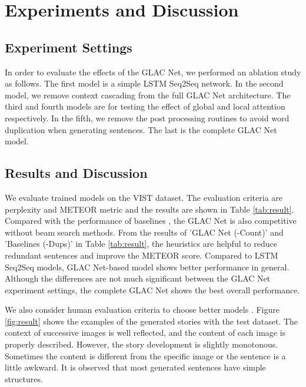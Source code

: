 \documentclass[11pt,a4paper]{article}
\begin{document}
\section{Experiments and Discussion}
\subsection{Experiment Settings}

In order to evaluate the effects of the GLAC Net, we performed an ablation study as follows. 
The first model is a simple LSTM Seq2Seq network.
In the second model, we remove context cascading from the full GLAC Net architecture. 
The third and fourth models are for testing the effect of global and local attention respectively.
In the fifth, we remove the post processing routines to avoid word duplication when generating sentences.
The last is the complete GLAC Net model.
\subsection{Results and Discussion} 


We evaluate trained models on the VIST dataset. 
The evaluation criteria are perplexity and METEOR metric and the results are shown in Table \ref{tab:result}. 
Compared with the performance of baselines \cite{huang2016visual}, the GLAC Net is also competitive without beam search methods. 
From the results of 'GLAC Net (-Count)' and 'Baselines (-Dups)' in Table \ref{tab:result}, the heuristics are helpful to reduce redundant sentences and improve the METEOR score.
Compared to LSTM Seq2Seq models, GLAC Net-based model shows better performance in general.
Although the differences are not much significant between the GLAC Net experiment settings, the complete GLAC Net shows the best overall performance.


We also consider human evaluation criteria to choose better models \cite{humanEvalVist}.
Figure \ref{fig:result} shows the examples of the generated stories with the test dataset. 
The context of successive images is well reflected, and the content of each image is properly described. 
However, the story development is slightly monotonous. 
Sometimes the content is different from the specific image or the sentence is a little awkward. 
It is observed that most generated sentences have simple structures.
\end{document}
